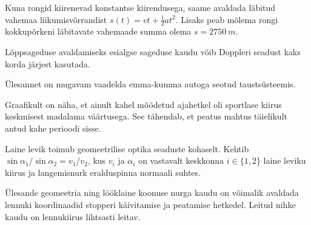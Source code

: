 \documentclass[10pt, twoside]{article}
\begin{document}
{%

\hint
Kuna rongid kiirenevad konstantse kiirendusega, saame avaldada läbitud vahemaa liikumisvõrrandist $s(t) = vt + \frac{1}{2}at^2$. Lisaks peab mõlema rongi kokkupõrkeni läbitavate vahemaade summa olema $s = \SI{2750}{m}$.
\probend
\bigskip


\hint
Lõppsageduse avaldamiseks esialgse sageduse kaudu võib Doppleri seadust kaks korda järjest kasutada.
\probend
\bigskip


\hint
Ülesannet on mugavam vaadelda emma-kumma autoga seotud taustsüsteemis.
\probend
\bigskip


\hint
Graafikult on näha, et ainult kahel mõõdetud ajahetkel oli sportlase kiirus keskmisest madalama väärtusega. See tähendab, et peatus mahtus täielikult antud kahe perioodi sisse.
\probend
\bigskip


\hint
Laine levik toimub geomeetrilise optika seaduste kohaselt. Kehtib $\sin \alpha_{1}/\sin \alpha_{2}=v_{1}/v_{2}$, kus $v_i$ ja $\alpha_i$ on vastavalt keskkonna $i\in \{1, 2\}$ laine leviku kiirus ja langemisnurk eralduspinna normaali suhtes.
\probend
\bigskip


\hint
Ülesande geomeetria ning lööklaine koonuse nurga kaudu on võimalik avaldada lennuki koordinaadid stopperi käivitamise ja peatamise hetkedel. Leitud nihke kaudu on lennukiirus lihtsasti leitav.
\probend
\bigskip


}
\end{document}
